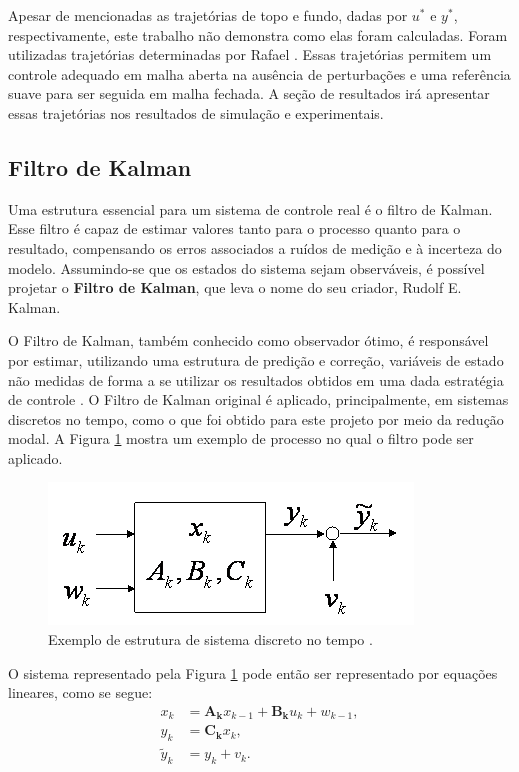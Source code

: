 Apesar de mencionadas as trajetórias de topo e fundo, dadas por $u^*$ e $y^*$, respectivamente, este trabalho não demonstra como elas foram calculadas. Foram utilizadas trajetórias determinadas por Rafael \cite{rafaelMestrado}. Essas trajetórias permitem um controle adequado em malha aberta na ausência de perturbações e uma referência suave para ser seguida em malha fechada. A seção de resultados irá apresentar essas trajetórias nos resultados de simulação e experimentais.

\subsection{Filtro de Kalman}
Uma estrutura essencial para um sistema de controle real é o filtro de Kalman. Esse filtro é capaz de estimar valores tanto para o processo quanto para o resultado, compensando os erros associados a ruídos de medição e à incerteza do modelo. Assumindo-se que os estados do sistema sejam observáveis, é possível projetar o \textbf{Filtro de Kalman}, que leva o nome do seu criador, Rudolf E. Kalman.

O Filtro de Kalman, também conhecido como observador ótimo, é responsável por estimar, utilizando uma estrutura de predição e correção, variáveis de estado não medidas de forma a se utilizar os resultados obtidos em uma dada estratégia de controle \cite{GoddardKalman}. O Filtro de Kalman original é aplicado, principalmente, em sistemas discretos no tempo, como o que foi obtido para este projeto por meio da redução modal. A Figura \ref{Kalman1} mostra um exemplo de processo no qual o filtro pode ser aplicado.
\begin{figure}[!ht]
\centering

\includegraphics[width=.5\linewidth]{figs/kalman/kalman1}
\caption{Exemplo de estrutura de sistema discreto no tempo \cite{GoddardKalman}. \label{Kalman1}}
\end{figure}

O sistema representado pela Figura \ref{Kalman1} pode então ser representado por equações lineares, como se segue:
\begin{align}
	\label{KalmanEq1}
	x_k &= \mathbf{A_k} x_{k-1} + \mathbf{B_k} u_k + w_{k-1}, \\
	\label{KalmanEq2}
	y_k &= \mathbf{C_k} x_k, \\
	\label{KalmanEq3}
	\tilde{y}_k &= y_k + v_k.
\end{align}

